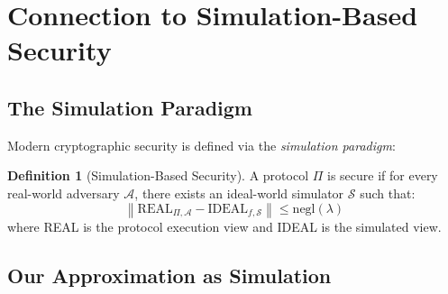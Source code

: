 \documentclass[11pt]{article}
\theoremstyle{definition}
\newtheorem{definition}{Definition}
\begin{document}
\section{Connection to Simulation-Based Security}

\subsection{The Simulation Paradigm}

Modern cryptographic security is defined via the \emph{simulation paradigm}:

\begin{definition}[Simulation-Based Security]
A protocol $\Pi$ is secure if for every real-world adversary $\mathcal{A}$, there exists 
an ideal-world simulator $\mathcal{S}$ such that:
\[
\left\| \text{REAL}_{\Pi,\mathcal{A}} - \text{IDEAL}_{f,\mathcal{S}} \right\| 
\leq \text{negl}(\lambda)
\]
where REAL is the protocol execution view and IDEAL is the simulated view.
\end{definition}

\subsection{Our Approximation as Simulation}
\end{document}
